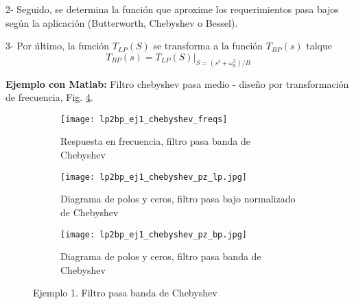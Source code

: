 \documentclass[informe.tex]{subfiles}
\begin{document}
	2- Seguido, se determina la función que aproxime los requerimientos pasa bajos según la aplicación (Butterworth, Chebyshev o Bessel).	
	
	3- Por último, la función $T_{LP}(S)$ se transforma a la función $T_{BP}(s)$ talque 
				$$T_{BP}(s)= \left. T_{LP}(S) \right|_{S=(s^2+\omega^2_0)/B}$$
				
\textbf{Ejemplo con Matlab:} Filtro chebyshev pasa medio - diseño por transformación de frecuencia, Fig. \ref{fig:transformacion:bp:ej1_freqs_bp}.\newline  

  		

 

\begin{figure}[h]
     \centering
     \begin{subfigure}[b]{0.3\textwidth}
         \centering
         \texttt{[image: lp2bp\_ej1\_chebyshev\_freqs]}
         \caption{Respuesta en frecuencia, filtro pasa banda de Chebyshev}
         \label{fig:transformacion:bp:ej1_freqs_bp:freqs_bp}
     \end{subfigure}
     \hfill
     \begin{subfigure}[b]{0.3\textwidth}
         \centering
         \texttt{[image: lp2bp\_ej1\_chebyshev\_pz\_lp.jpg]}
         \caption{Diagrama de polos y ceros, filtro pasa bajo normalizado de Chebyshev}
         \label{fig:transformacion:bp:ej1_freqs_lp:pz}
     \end{subfigure}
     \hfill
     \begin{subfigure}[b]{0.3\textwidth}
         \centering
         \texttt{[image: lp2bp\_ej1\_chebyshev\_pz\_bp.jpg]}
         \caption{Diagrama de polos y ceros, filtro pasa banda de Chebyshev}
         \label{fig:transformacion:bp:ej1_freqs_bp:pz}
     \end{subfigure}
 	 \caption{Ejemplo 1. Filtro pasa banda de Chebyshev}
     \label{fig:transformacion:bp:ej1_freqs_bp}
\end{figure}
\end{document}
